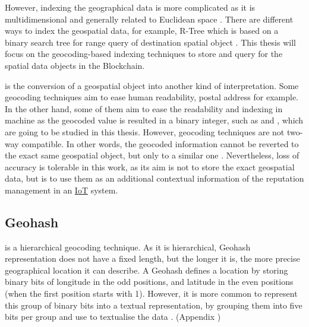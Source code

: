 \npara However, indexing the geographical data is more complicated as it is multidimensional and generally related to Euclidean space \citep{SpatialIndexing}.
There are different ways to index the geospatial data, for example, R-Tree which is based on a binary search tree for range query of destination spatial object \citep{RTrees}.
This thesis will focus on the geocoding-based indexing techniques to store and query for the spatial data objects in the Blockchain.

\npara {} is the conversion of a geospatial object into another kind of interpretation.
Some geocoding techniques aim to ease human readability, postal address for example.
In the other hand, some of them aim to ease the readability and indexing in machine as the geocoded value is resulted in a binary integer, such as  and , which are going to be studied in this thesis.
However, geocoding techniques are not two-way compatible.
In other words, the geocoded information cannot be reverted to the exact same geospatial object, but only to a similar one \citep{FastGeohash}.
Nevertheless, loss of accuracy is tolerable in this work, as its aim is not to store the exact geospatial data, but is to use them as an additional contextual information of the reputation management in an \hyperref[Acronym-IoT]{IoT} system.

\subsection{Geohash}

\npara {} is a hierarchical geocoding technique.
As it is hierarchical, Geohash representation does not have a fixed length, but the longer it is, the more precise geographical location it can describe.
A Geohash defines a location by storing binary bits of longitude in the odd positions, and latitude in the even positions (when the first position starts with 1).
However, it is more common to represent this group of binary bits into a textual representation, by grouping them into five bits per group and use  to textualise the data \citep{GeohashIndex}.
(Appendix \textit{})

